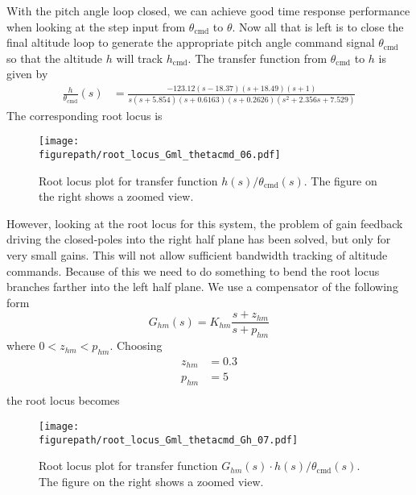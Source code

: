 \documentclass[]{../sty/aiaa-tc}
\newcommand{\figurepath}{../fig}
\theoremstyle{examplestyle}
\begin{document}
  With the pitch angle loop closed, we can achieve good time response performance when looking at the step input from $\theta_{\text{cmd}}$ to $\theta$.
  Now all that is left is to close the final altitude loop to generate the appropriate pitch angle command signal $\theta_{\text{cmd}}$ so that the altitude $h$ will track $h_{\text{cmd}}$.
  The transfer function from $\theta_{\text{cmd}}$ to $h$ is given by
  \begin{equation*}
    \begin{split}
      \frac{h}{\theta_{\text{cmd}}}(s)&=\frac{-123.12 (s-18.37) (s+18.49) (s+1)}{s (s + 5.854) (s + 0.6163) (s+0.2626) (s^{2} + 2.356s + 7.529)}
    \end{split}
  \end{equation*}
  The corresponding root locus is
  \begin{figure}[H]
    \begin{center}
      \texttt{[image: \\figurepath/root\_locus\_Gml\_thetacmd\_06.pdf]}
      \vspace{-0.1in}
      \caption{Root locus plot for transfer function $h(s)/\theta_{\text{cmd}}(s)$. The figure on the right shows a zoomed view.}
    \end{center}
  \end{figure}
  However, looking at the root locus for this system, the problem of gain feedback driving the closed-poles into the right half plane has been solved, but only for very small gains.
  This will not allow sufficient bandwidth tracking of altitude commands.
  Because of this we need to do something to bend the root locus branches farther into the left half plane.
  We use a compensator of the following form
  \begin{equation}
    \label{eqn.Ghm}
    G_{hm}(s)=K_{hm}\frac{s+z_{hm}}{s+p_{hm}}
  \end{equation}
  where $0<z_{hm}<p_{hm}$.
  Choosing
  \begin{equation*}
    \begin{split}
      z_{hm} & = 0.3 \\
      p_{hm} & = 5 \\
    \end{split}
  \end{equation*}
  the root locus becomes
  \begin{figure}[H]
    \begin{center}
      \texttt{[image: \\figurepath/root\_locus\_Gml\_thetacmd\_Gh\_07.pdf]}
      \vspace{-0.1in}
      \caption{Root locus plot for transfer function $G_{hm}(s)\cdot h(s)/\theta_{\text{cmd}}(s)$. The figure on the right shows a zoomed view.}
    \end{center}
  \end{figure}
\end{document}
